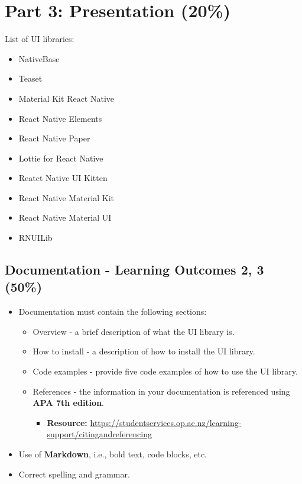\documentclass{article}
\begin{document}
\section{Part 3: Presentation (20\%)}

List of UI libraries:

\begin{itemize}
	\item NativeBase
	\item Teaset
	\item Material Kit React Native
	\item React Native Elements
	\item React Native Paper
	\item Lottie for React Native
	\item Reatct Native UI Kitten
	\item React Native Material Kit
	\item React Native Material UI
	\item RNUILib
\end{itemize}

\subsection*{Documentation - Learning Outcomes 2, 3 (50\%)}
\begin{itemize}
	\item Documentation must contain the following sections:
	      \begin{itemize}
		      \item Overview - a brief description of what the UI library is.
		      \item How to install - a description of how to install the UI library.
		      \item Code examples - provide five code examples of how to use the UI library.
		      \item References - the information in your documentation is referenced using \textbf{APA 7th edition}.
		            \begin{itemize}
			            \item \textbf{Resource:} \href{https://studentservices.op.ac.nz/learning-support/citingandreferencing}{https://studentservices.op.ac.nz/learning-support/citingandreferencing}
		            \end{itemize}
	      \end{itemize}
	\item Use of \textbf{Markdown}, i.e., bold text, code blocks, etc.
	\item Correct spelling and grammar.
\end{itemize}
\end{document}
